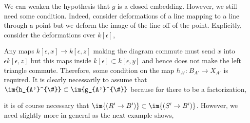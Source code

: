 \documentclass[12pt]{article}
\begin{document}
\begin{rmk}
We can weaken the hypothesis that $g$ is a closed embedding. However, we still need some condition. Indeed, consider deformations of a line mapping to a line through a point but we deform the image of the line off of the point. Explicitly, consider the deformations over $k[\epsilon]$,
\begin{center}
\end{center}
Any maps $k[\epsilon, x] \to k[\epsilon, z]$ making the diagram commute must send $x$ into $\epsilon k[\epsilon, z]$ but this maps inside $k[\epsilon] \subset k[\epsilon, y]$ and hence does not make the left triangle commute. Therefore, some condition on the map $h_{A'} : B_{A'} \to X_{A'}$ is required. It is clearly necessarily to assume that $\im{h_{A'}^{\#}} \subset \im{g_{A'}^{\#}}$ because for there to be a factorization,
\begin{center}
\end{center}
it is of course necessary that $\im{(R' \to B')} \subset \im{(S' \to B')}$. However, we need slightly more in general as the next example shows,
\begin{center}
\end{center}

\end{rmk}
\end{document}
